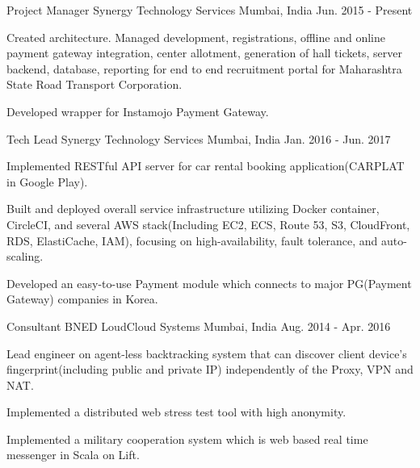 

\begin{cventries}

  \cventry
    {Project Manager} %
    {Synergy Technology Services} %
    {Mumbai, India} %
    {Jun. 2015 - Present} %
    {
      \begin{cvitems} %
        \item {Created architecture. Managed development, registrations, offline and online payment gateway integration, center allotment, generation of hall tickets, server backend, database, reporting for end to end recruitment portal for Maharashtra State Road Transport Corporation.}
        \item {Developed wrapper for Instamojo Payment Gateway.}
      \end{cvitems}
    }

  \cventry
    {Tech Lead} %
    {Synergy Technology Services} %
    {Mumbai, India} %
    {Jan. 2016 - Jun. 2017} %
    {
      \begin{cvitems} %
        \item {Implemented RESTful API server for car rental booking application(CARPLAT in Google Play).}
        \item {Built and deployed overall service infrastructure utilizing Docker container, CircleCI, and several AWS stack(Including EC2, ECS, Route 53, S3, CloudFront, RDS, ElastiCache, IAM), focusing on high-availability, fault tolerance, and auto-scaling.}
        \item {Developed an easy-to-use Payment module which connects to major PG(Payment Gateway) companies in Korea.}
      \end{cvitems}
    }

  \cventry
    {Consultant} %
    {BNED LoudCloud Systems} %
    {Mumbai, India} %
    {Aug. 2014 - Apr. 2016} %
    {
      \begin{cvitems} %
        \item {Lead engineer on agent-less backtracking system that can discover client device's fingerprint(including public and private IP) independently of the Proxy, VPN and NAT.}
        \item {Implemented a distributed web stress test tool with high anonymity.}
        \item {Implemented a military cooperation system which is web based real time messenger in Scala on Lift.}
      \end{cvitems}
    }


\end{cventries}
